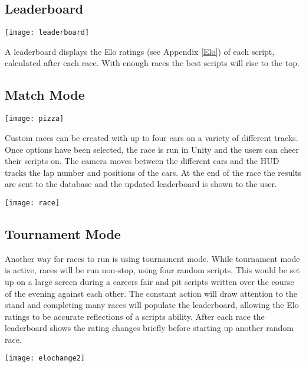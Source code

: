 \subsection{Leaderboard}
\centerline{\texttt{[image: leaderboard]}}
A leaderboard displays the Elo ratings (see Appendix \ref{Elo}) of each script, calculated after each race. With enough races the best scripts will rise to the top.

\subsection{Match Mode}
\centerline{\texttt{[image: pizza]}}
Custom races can be created with up to four cars on a variety of different tracks. Once options have been selected, the race is run in Unity and the users can cheer their scripts on. The camera moves between the different cars and the HUD tracks the lap number and positions of the cars. At the end of the race the results are sent to the database and the updated leaderboard is shown to the user.

\centerline{\texttt{[image: race]}}

\subsection{Tournament Mode}
Another way for races to run is using tournament mode. While tournament mode is active, races will be run non-stop, using four random scripts. This would be set up on a large screen during a careers fair and pit scripts written over the course of the evening against each other. The constant action will draw attention to the stand and completing many races will populate the leaderboard, allowing the Elo ratings to be accurate reflections of a scripts ability. After each race the leaderboard shows the rating changes briefly before starting up another random race.

\centerline{\texttt{[image: elochange2]}}